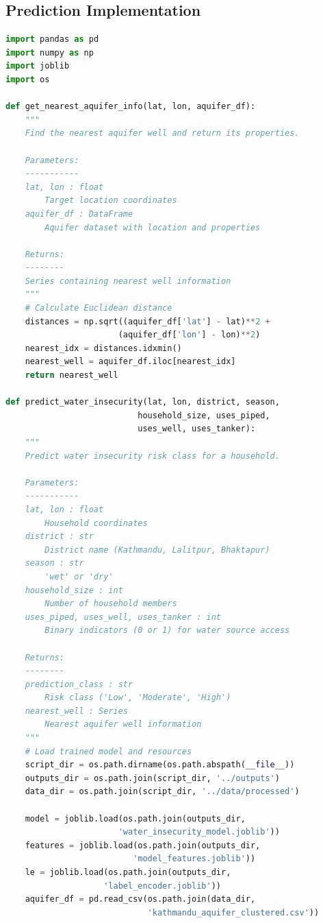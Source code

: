 \documentclass[conference]{IEEEtran}
\begin{document}
\subsection{Prediction Implementation}
\begin{lstlisting}[language=Python, caption=Water Insecurity Prediction Function]
import pandas as pd
import numpy as np
import joblib
import os

def get_nearest_aquifer_info(lat, lon, aquifer_df):
    """
    Find the nearest aquifer well and return its properties.
    
    Parameters:
    -----------
    lat, lon : float
        Target location coordinates
    aquifer_df : DataFrame
        Aquifer dataset with location and properties
        
    Returns:
    --------
    Series containing nearest well information
    """
    # Calculate Euclidean distance
    distances = np.sqrt((aquifer_df['lat'] - lat)**2 + 
                       (aquifer_df['lon'] - lon)**2)
    nearest_idx = distances.idxmin()
    nearest_well = aquifer_df.iloc[nearest_idx]
    return nearest_well

def predict_water_insecurity(lat, lon, district, season, 
                           household_size, uses_piped, 
                           uses_well, uses_tanker):
    """
    Predict water insecurity risk class for a household.
    
    Parameters:
    -----------
    lat, lon : float
        Household coordinates
    district : str
        District name (Kathmandu, Lalitpur, Bhaktapur)
    season : str
        'wet' or 'dry'
    household_size : int
        Number of household members
    uses_piped, uses_well, uses_tanker : int
        Binary indicators (0 or 1) for water source access
        
    Returns:
    --------
    prediction_class : str
        Risk class ('Low', 'Moderate', 'High')
    nearest_well : Series
        Nearest aquifer well information
    """
    # Load trained model and resources
    script_dir = os.path.dirname(os.path.abspath(__file__))
    outputs_dir = os.path.join(script_dir, '../outputs')
    data_dir = os.path.join(script_dir, '../data/processed')
    
    model = joblib.load(os.path.join(outputs_dir, 
                       'water_insecurity_model.joblib'))
    features = joblib.load(os.path.join(outputs_dir, 
                          'model_features.joblib'))
    le = joblib.load(os.path.join(outputs_dir, 
                    'label_encoder.joblib'))
    aquifer_df = pd.read_csv(os.path.join(data_dir, 
                             'kathmandu_aquifer_clustered.csv'))
    

\end{lstlisting}
\end{document}
